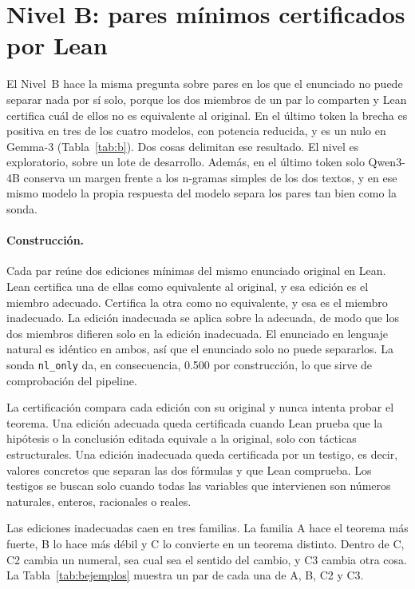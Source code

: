 \documentclass[10pt]{article}
\newcommand{\vr}[1]{\texttt{#1}}
\begin{document}
\section{Nivel B: pares mínimos certificados por Lean}\label{sec:b}

El Nivel~B hace la misma pregunta sobre pares en los que el enunciado no puede separar nada por sí solo, porque los
dos miembros de un par lo comparten y Lean certifica cuál de ellos no es equivalente al original. En el último token
la brecha es positiva en tres de los cuatro modelos, con potencia reducida, y es un nulo en Gemma-3
(Tabla~\ref{tab:b}). Dos cosas delimitan ese resultado. El nivel es exploratorio, sobre un lote de desarrollo. Además,
en el último token solo Qwen3-4B conserva un margen frente a los n-gramas simples de los dos textos, y en ese mismo
modelo la propia respuesta del modelo separa los pares tan bien como la sonda.

\paragraph{Construcción.}
Cada par reúne dos ediciones mínimas del mismo enunciado original en Lean. Lean certifica una de ellas como
equivalente al original, y esa edición es el miembro adecuado. Certifica la otra como no equivalente, y esa es el
miembro inadecuado.
La edición inadecuada se aplica sobre la adecuada, de modo que los dos miembros difieren solo en la edición inadecuada. El enunciado en lenguaje natural es idéntico en ambos, así que el enunciado solo no puede
separarlos. La sonda \vr{nl\_only} da, en consecuencia, 0.500 por construcción, lo que sirve de comprobación del
pipeline.

La certificación compara cada edición con su original y nunca intenta probar el teorema. Una edición adecuada queda
certificada cuando Lean prueba que la hipótesis o la conclusión editada equivale a la original, solo con tácticas
estructurales. Una edición inadecuada queda certificada por un testigo, es decir, valores concretos que separan las
dos fórmulas y que Lean comprueba. Los testigos se buscan solo cuando todas las variables que intervienen son números
naturales, enteros, racionales o reales.

Las ediciones inadecuadas caen en tres familias. La familia A hace el teorema más fuerte, B lo hace más débil y C
lo convierte en un teorema distinto. Dentro de C, C2 cambia un numeral, sea cual sea el sentido del cambio, y C3 cambia otra cosa.
La Tabla~\ref{tab:bejemplos} muestra un par de cada una de A, B, C2 y C3.
\end{document}
